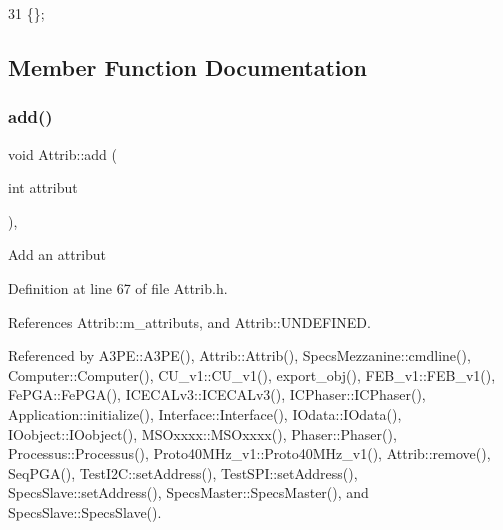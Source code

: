 \begin{DoxyCode}
31 \{\}; 
\end{DoxyCode}


\subsection{Member Function Documentation}
\mbox{\label{classAttrib_a235f773af19c900264a190b00a3b4ad7}} 
\subsubsection{\texorpdfstring{add()}{add()}}
{\footnotesize\ttfamily void Attrib\+::add (\begin{DoxyParamCaption}\item[{int}]{attribut }\end{DoxyParamCaption})\hspace{0.3cm}{\ttfamily [inline]}, {\ttfamily [inherited]}}

Add an attribut 

Definition at line 67 of file Attrib.\+h.



References Attrib\+::m\+\_\+attributs, and Attrib\+::\+U\+N\+D\+E\+F\+I\+N\+ED.



Referenced by A3\+P\+E\+::\+A3\+P\+E(), Attrib\+::\+Attrib(), Specs\+Mezzanine\+::cmdline(), Computer\+::\+Computer(), C\+U\+\_\+v1\+::\+C\+U\+\_\+v1(), export\+\_\+obj(), F\+E\+B\+\_\+v1\+::\+F\+E\+B\+\_\+v1(), Fe\+P\+G\+A\+::\+Fe\+P\+G\+A(), I\+C\+E\+C\+A\+Lv3\+::\+I\+C\+E\+C\+A\+Lv3(), I\+C\+Phaser\+::\+I\+C\+Phaser(), Application\+::initialize(), Interface\+::\+Interface(), I\+Odata\+::\+I\+Odata(), I\+Oobject\+::\+I\+Oobject(), M\+S\+Oxxxx\+::\+M\+S\+Oxxxx(), Phaser\+::\+Phaser(), Processus\+::\+Processus(), Proto40\+M\+Hz\+\_\+v1\+::\+Proto40\+M\+Hz\+\_\+v1(), Attrib\+::remove(), Seq\+P\+G\+A(), Test\+I2\+C\+::set\+Address(), Test\+S\+P\+I\+::set\+Address(), Specs\+Slave\+::set\+Address(), Specs\+Master\+::\+Specs\+Master(), and Specs\+Slave\+::\+Specs\+Slave().


